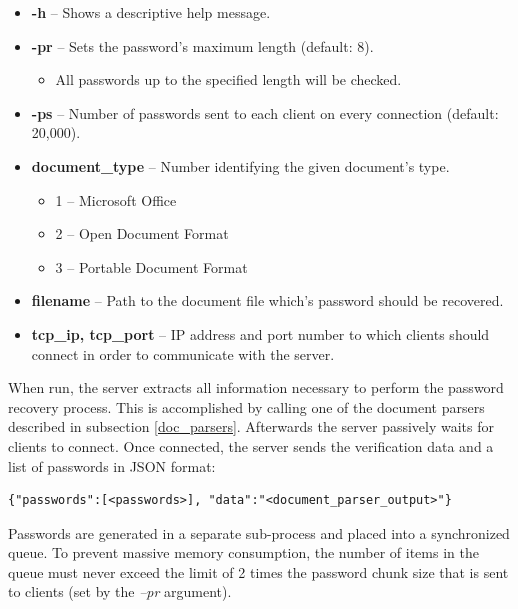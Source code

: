 \documentclass[11pt,oneside]{fithesis2}
\begin{document}
\begin{itemize}
\setlength\itemsep{0.1em}
	\item{\textbf{-h} -- Shows a descriptive help message.}
	\item{\textbf{-pr} -- Sets the password's maximum length (default: 8).}
		\begin{itemize}
		\setlength\itemsep{0.1em}
			\item{All passwords up to the specified length will be checked.}
		\end{itemize}
	\item{\textbf{-ps} -- Number of passwords sent to each client on every connection (default: 20,000).}
	\item{\textbf{document\_type} -- Number identifying the given document's type.}
		\begin{itemize}
		\setlength\itemsep{0.1em}
			\item{1 -- Microsoft Office}
			\item{2 -- Open Document Format}
			\item{3 -- Portable Document Format}
		\end{itemize}
	\item{\textbf{filename} -- Path to the document file which's password should be recovered.}
	\item{\textbf{tcp\_ip, tcp\_port} --  IP address and port number to which clients should connect in order to communicate with the server.}
\end{itemize}\label{server_params}

When run, the server extracts all information necessary to perform the password recovery process. This is accomplished by calling one of the document parsers described in subsection \ref{doc_parsers}. Afterwards the server passively waits for clients to connect. Once connected, the server sends the verification data and a list of passwords in JSON \cite{rfc7159} format:

\begin{lstlisting} 
{"passwords":[<passwords>], "data":"<document_parser_output>"}
\end{lstlisting}\label{server_message}

Passwords are generated in a separate sub-process and placed into a synchronized queue. To prevent massive memory consumption, the number of items in the queue must never exceed the limit of 2 times the password chunk size that is sent to clients (set by the \textit{–pr} argument).
\end{document}
